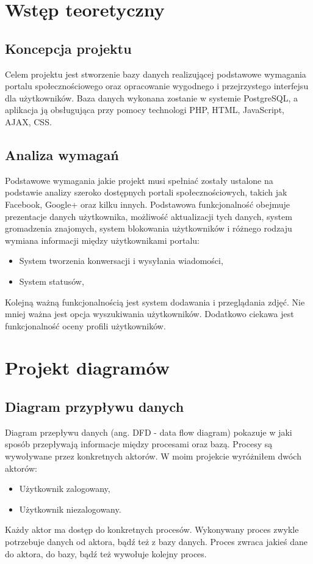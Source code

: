 \documentclass[a4paper,10pt,table]{article}
\begin{document}
\section{Wstęp teoretyczny}
\subsection{Koncepcja projektu}
Celem projektu jest stworzenie bazy danych realizującej podstawowe wymagania portalu społecznościowego oraz opracowanie wygodnego i przejrzystego interfejsu dla użytkowników. Baza danych wykonana zostanie w systemie PostgreSQL, a aplikacja ją obsługująca przy pomocy technologi PHP, HTML, JavaScript, AJAX, CSS.
\subsection{Analiza wymagań}
Podstawowe wymagania jakie projekt musi spełniać zostały ustalone na podstawie analizy szeroko dostępnych portali społecznościowych, takich jak Facebook, Google+ oraz kilku innych. Podstawowa funkcjonalność obejmuje prezentacje danych użytkownika, możliwość aktualizacji tych danych, system gromadzenia znajomych, system blokowania użytkowników i różnego rodzaju wymiana informacji między użytkownikami portalu:
\begin{itemize}
\item System tworzenia konwersacji i wysyłania wiadomości,
\item System statusów,
\end{itemize}
Kolejną ważną funkcjonalnością jest system dodawania i przeglądania zdjęć. Nie mniej ważna jest opcja wyszukiwania użytkowników. Dodatkowo ciekawa jest funkcjonalność oceny profili użytkowników.
\newpage
\section{Projekt diagramów}
\subsection{Diagram przypływu danych}
Diagram przepływu danych (ang. DFD - data flow diagram) pokazuje w jaki sposób przepływają informacje między procesami oraz bazą. Procesy są wywoływane przez konkretnych aktorów. W moim projekcie wyróżniłem dwóch aktorów:
\begin{itemize}
\item Użytkownik zalogowany,
\item Użytkownik niezalogowany.
\end{itemize}
Każdy aktor ma dostęp do konkretnych procesów. Wykonywany proces zwykle potrzebuje danych od aktora, bądź też z bazy danych. Proces zwraca jakieś dane do aktora, do bazy, bądź też wywołuje kolejny proces.
\end{document}
